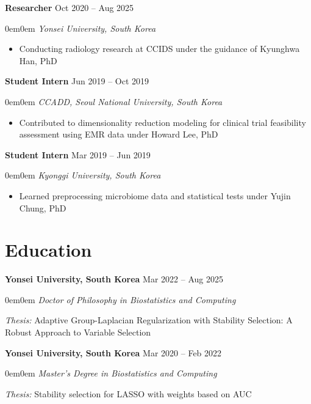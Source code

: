 \documentclass[10pt,a4paper]{article}
\newcommand{\CVItem}[2]{
    \noindent\textbf{#1} \hfill #2\\
}
\newcommand{\CVSubItem}[1]{
    \vspace{-0.8em}
    \begin{adjustwidth}{0em}{0em}
    \textit{#1}
    \end{adjustwidth}
    \vspace{0.3em}
}
\begin{document}
\vspace{0.3em}

\CVItem{Researcher}{Oct 2020 -- Aug 2025}
\CVSubItem{Yonsei University, South Korea}
\vspace{-0.5em}
\begin{itemize}
    \item Conducting radiology research at CCIDS under the guidance of Kyunghwa Han, PhD
\end{itemize}

\vspace{0.3em}

\CVItem{Student Intern}{Jun 2019 -- Oct 2019}
\CVSubItem{CCADD, Seoul National University, South Korea}
\vspace{-0.5em}
\begin{itemize}
    \item Contributed to dimensionality reduction modeling for clinical trial feasibility assessment using EMR data under Howard Lee, PhD
\end{itemize}

\vspace{0.3em}

\CVItem{Student Intern}{Mar 2019 -- Jun 2019}
\CVSubItem{Kyonggi University, South Korea}
\vspace{-0.5em}
\begin{itemize}
    \item Learned preprocessing microbiome data and statistical tests under Yujin Chung, PhD
\end{itemize}

\section*{Education}

\CVItem{Yonsei University, South Korea}{Mar 2022 -- Aug 2025}
\CVSubItem{Doctor of Philosophy in Biostatistics and Computing}
\noindent\textit{Thesis:} Adaptive Group-Laplacian Regularization with Stability Selection: A Robust Approach to Variable Selection

\vspace{0.5em}

\CVItem{Yonsei University, South Korea}{Mar 2020 -- Feb 2022}
\CVSubItem{Master's Degree in Biostatistics and Computing}
\noindent\textit{Thesis:} Stability selection for LASSO with weights based on AUC

\vspace{0.5em}
\end{document}
